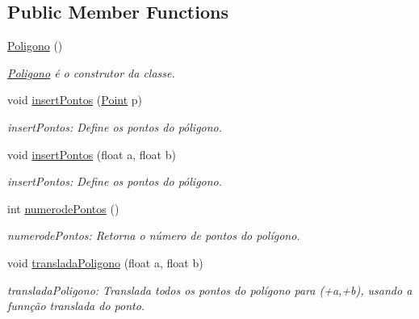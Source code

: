 \subsection*{Public Member Functions}
\begin{DoxyCompactItemize}
\item 
\mbox{\label{class_poligono_a9311a9a1496878c09c8508b3636e2870}} 
\mbox{\hyperlink{class_poligono_a9311a9a1496878c09c8508b3636e2870}{Poligono}} ()
\begin{DoxyCompactList}\small\item\em \mbox{\hyperlink{class_poligono}{Poligono}} é o construtor da classe. \end{DoxyCompactList}\item 
void \mbox{\hyperlink{class_poligono_a9bd6496f563d349046c74e3b0f03ef19}{insert\+Pontos}} (\mbox{\hyperlink{class_point}{Point}} p)
\begin{DoxyCompactList}\small\item\em insert\+Pontos\+: Define os pontos do póligono. \end{DoxyCompactList}\item 
void \mbox{\hyperlink{class_poligono_a7db9753df6a913b910f3d293f6324267}{insert\+Pontos}} (float a, float b)
\begin{DoxyCompactList}\small\item\em insert\+Pontos\+: Define os pontos do póligono. \end{DoxyCompactList}\item 
\mbox{\label{class_poligono_a9d011cabfeeeb85eae016cd2474b5e59}} 
int \mbox{\hyperlink{class_poligono_a9d011cabfeeeb85eae016cd2474b5e59}{numerode\+Pontos}} ()
\begin{DoxyCompactList}\small\item\em numerode\+Pontos\+: Retorna o número de pontos do polígono. \end{DoxyCompactList}\item 
void \mbox{\hyperlink{class_poligono_a4d757f52ba9366ab13537fb19b363e1e}{translada\+Poligono}} (float a, float b)
\begin{DoxyCompactList}\small\item\em translada\+Poligono\+: Translada todos os pontos do polígono para (+a,+b), usando a funnção translada do ponto. \end{DoxyCompactList}\item 
\mbox{\label{class_poligono_ac1e37e274f61dff6c421f972ef1cf891}} 

\end{DoxyCompactItemize}
